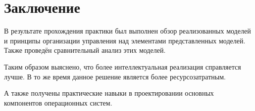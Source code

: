 \newpage
\section{Заключение}
	В результате прохождения практики был выполнен обзор реализованных моделей и принципы организации управления
		над элементами представленных моделей. Также проведён сравнительный анализ этих моделей.

	Таким образом выяснено, что более интеллектуальная реализация справляется лучше.
		В то же время данное решение является более ресурсозатратным.

	А также получены практические навыки в проектировании основных компонентов операционных систем.
